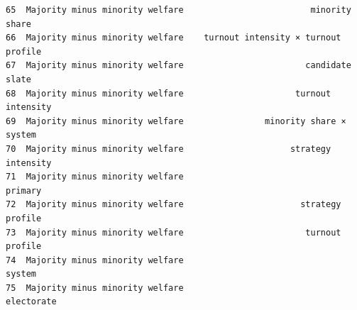 \documentclass[11pt]{article}
\begin{document}
\begin{tcolorbox}[breakable, size=fbox, boxrule=.5pt, pad at break*=1mm, opacityfill=0]
\begin{Verbatim}[commandchars=\\\{\}]
65  Majority minus minority welfare                         minority share
66  Majority minus minority welfare    turnout intensity × turnout profile
67  Majority minus minority welfare                        candidate slate
68  Majority minus minority welfare                      turnout intensity
69  Majority minus minority welfare                minority share × system
70  Majority minus minority welfare                     strategy intensity
71  Majority minus minority welfare                                primary
72  Majority minus minority welfare                       strategy profile
73  Majority minus minority welfare                        turnout profile
74  Majority minus minority welfare                                 system
75  Majority minus minority welfare                             electorate


\end{Verbatim}
\end{tcolorbox}
\end{document}
